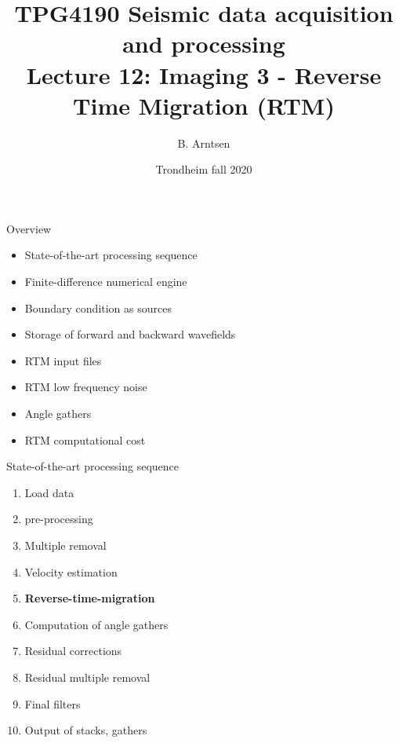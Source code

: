 \documentclass[xcolor=dvipsnames,notes]{beamer}
\begin{document}
\title{TPG4190 Seismic data acquisition and processing \\
               Lecture 12: Imaging 3 - Reverse Time Migration (RTM)}
\author{B. Arntsen}
\date{Trondheim fall 2020}
\begin{frame}
 \titlepage
\end{frame}
%
\begin{frame}{Overview}
\begin{itemize}
  \item State-of-the-art processing sequence
  \item Finite-difference numerical engine
  \item Boundary condition as sources
  \item Storage of forward and backward wavefields
  \item RTM input files
  \item RTM low frequency noise
  \item Angle gathers
  \item RTM computational cost
  \end{itemize}
\end{frame}
\begin{frame}{State-of-the-art processing sequence}
\begin{enumerate}
  \item Load data
  \item pre-processing
  \item Multiple removal
  \item Velocity estimation
  \item \textbf{Reverse-time-migration}
  \item Computation of angle gathers
  \item Residual corrections 
  \item Residual multiple removal
  \item Final filters
  \item Output of stacks, gathers
\end{enumerate}
\end{frame}
\end{document}
